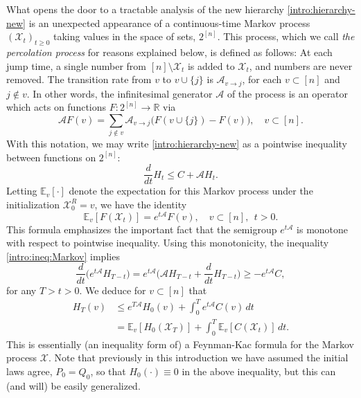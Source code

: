 \documentclass[11pt,reqno]{amsart}
\numberwithin{equation}{section}
\theoremstyle{definition}
\def\CC{{C}}
\def\A{{\mathcal A}}
\def\E{{\mathbb E}}
\def\R{{\mathbb R}}
\def\X{{\mathcal X}}
\begin{document}
What opens the door to a tractable analysis of the new hierarchy \eqref{intro:hierarchy-new}  is an unexpected appearance of a 
continuous-time Markov process $(\X_t)_{t \ge 0}$ taking values in the space of sets, $2^{[n]}$. This process, which we call \emph{the percolation process} for reasons explained below, is defined as follows: At each jump time, a single number from $[n] \setminus \X_t$ is added to $\X_t$, and numbers are never removed.  The transition rate from $v$ to $v\cup \{j\}$ is $\A_{v \to j}$, for each $v \subset [n]$ and $j \notin v$. 
In other words, the infinitesimal generator $\A$ of the process is an operator which acts on functions $F : 2^{[n]} \to \R$ via
\begin{equation*}
\A F(v) = \sum_{j \notin v}\A_{v \to j} \big(F(v \cup \{j\}) - F(v)\big), \quad v \subset [n].
\end{equation*} 
With this notation, we may write \eqref{intro:hierarchy-new} as a pointwise inequality between functions on $2^{[n]}$:
\begin{equation}
\frac{d}{dt}H_t \le \CC + \A H_t. \label{intro:ineq:Markov}
\end{equation}
Letting $\E_v[\cdot]$ denote the expectation for this Markov process under the initialization $\X_0^{R}=v$, we have the identity
\begin{equation*}
\E_v[F(\X_t)] = e^{t\A}F(v) , \quad v \subset [n], \ \ t > 0.
\end{equation*}
This formula emphasizes the important fact that the semigroup $e^{t\A}$ is monotone with respect to pointwise inequality.
Using this monotonicity, the inequality \eqref{intro:ineq:Markov} implies
\begin{equation*}
\frac{d}{dt}\Big( e^{t\A} H_{T-t}\Big) = e^{t\A} \Big(\A H_{T-t} + \frac{d}{dt}H_{T-t}\Big)  \ge - e^{t\A}\CC,
\end{equation*}
for any $T > t > 0$. We deduce for $v \subset [n]$ that
\begin{align}
H_{T}(v) &\le e^{T\A}H_{0}(v) + \int_0^T e^{t\A}\CC(v)\,dt \nonumber \\
	&= \E_v[H_{0}(\X_T)] + \int_0^T \E_v[\CC(\X_t)]\,dt .  \label{intro:Hv-bound}
\end{align}
This is essentially (an inequality form of) a Feynman-Kac formula for the Markov process $\X$. Note that previously in this introduction we have assumed the initial laws agree, $P_0=Q_0$, so that $H_0(\cdot)\equiv 0$ in the above inequality, but this can (and will) be easily generalized.
\end{document}
